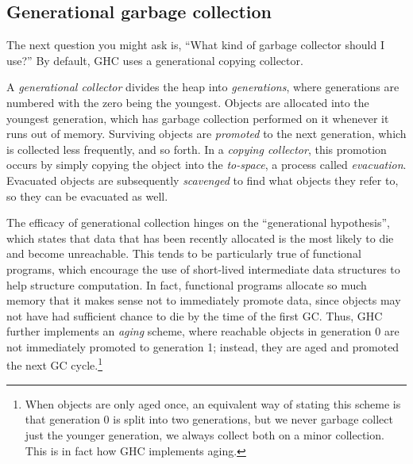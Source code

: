 \subsection{Generational garbage collection}

The next question you might ask is, ``What kind of garbage collector
should I use?''  By default, GHC uses a generational copying collector.

A \emph{generational collector} divides the heap into
\emph{generations}, where generations are numbered with the zero being
the youngest.  Objects are allocated into the youngest generation, which
has garbage collection performed on it whenever it runs out of memory.
Surviving objects are \emph{promoted} to the next generation, which is
collected less frequently, and so forth.  In a \emph{copying collector}, this
promotion occurs by simply copying the object into the \emph{to-space},
a process called \emph{evacuation}.  Evacuated objects are subsequently
\emph{scavenged} to find what objects they refer to, so they can be evacuated as well.



The efficacy of generational collection hinges on the ``generational
hypothesis'', which states that data that has been recently allocated is
the most likely to die and become unreachable.  This tends to be
particularly true of functional programs, which encourage the use of short-lived
intermediate data structures to help structure computation.  In fact,
functional programs allocate so much memory that it makes sense not to
immediately promote data, since objects may not have had sufficient
chance to die by the time of the first GC.  Thus, GHC further implements
an \emph{aging} scheme, where reachable objects in generation 0 are not
immediately promoted to generation 1; instead, they are aged and
promoted the next GC cycle.\footnote{When objects are only aged once, an
equivalent way of stating this scheme is that generation 0 is split into
two generations, but we never garbage collect just the younger
generation, we always collect both on a minor collection.  This is in fact
how GHC implements aging.}

